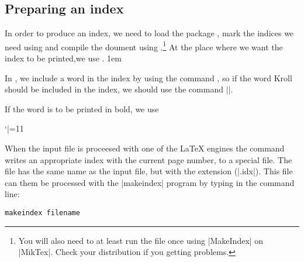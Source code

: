 \stoptemplate

\pagestyle{headings}


\setlength{\columnsep}{2em}
\begin{multicols}{2}

\section{Preparing an index}


In order to produce an index, we need to load the
package , mark the indices we need using   and compile the doument using  \cmd{\makeindex}.\footnote{You will also need to at least run the file once using |MakeIndex| on |MikTex|. Check your distribution if you getting problems.}
At the place where we want the index to be printed,we use .
\parindent1em

In \latex, we include a word
in the index by using the command \cmd{\index}, so if the word Kroll should be included in
the index, we should use the command ||.

If the word is to be printed in bold, we use

\bgroup
 \catcode`|=11
\gdef\idxmain#1{%
   \def\idxmainentryi##1##2##3;{%
      \index{Kroll=\textbf{#1}|textbf}
    }
   \idxmainentryi#1;    
}  
\egroup

\idxmain{Kroll}




When the input file is proceesed with one of the LaTeX engines the  command
writes an appropriate index with the current page number, to a special file. The file has the same
name as the \latex input file, but with the extension (|.idx|). This file can them be processed with the |makeindex|
program by typing in the command line:

\begin{verbatim}
makeindex filename
\end{verbatim}


\end{multicols}
